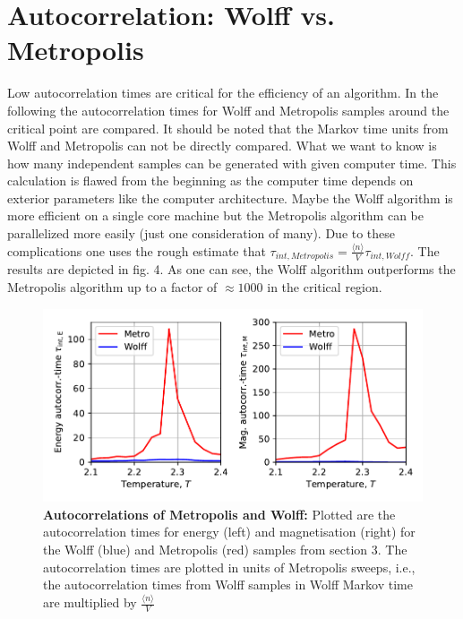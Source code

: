 \documentclass[11pt, a4paper]{scrartcl}
\begin{document}
\section{Autocorrelation: Wolff vs. Metropolis}
    Low autocorrelation times are critical for the efficiency of an algorithm. In the following the autocorrelation times for Wolff and Metropolis samples around the critical point are compared. It should be noted that the Markov time units from Wolff and Metropolis can not be directly compared. What we want to know is how many independent samples can be generated with given computer time. This calculation is flawed from the beginning as the computer time depends on exterior parameters like the computer architecture. Maybe the Wolff algorithm is more efficient on a single core machine but the Metropolis algorithm can be parallelized more easily (just one consideration of many). Due to these complications one uses the rough estimate that $\tau_{int, Metropolis} = \frac{\langle n \rangle}{V} \tau_{int, Wolff}$. The results are depicted in fig. 4. As one can see, the Wolff algorithm outperforms the Metropolis algorithm up to a factor of $\approx 1000$ in the critical region.
    \begin{figure}
    \begin{centering}
        \includegraphics{autocorrelations.pdf}
        \caption{\textbf{Autocorrelations of Metropolis and Wolff: } Plotted are the autocorrelation times for energy (left) and magnetisation (right) for the Wolff (blue) and Metropolis (red) samples from section 3. The autocorrelation times are plotted in units of Metropolis sweeps, i.e., the autocorrelation times from Wolff samples in Wolff Markov time are multiplied by $\frac{\langle n \rangle}{V}$}
    \end{centering}
    \end{figure}
\end{document}
